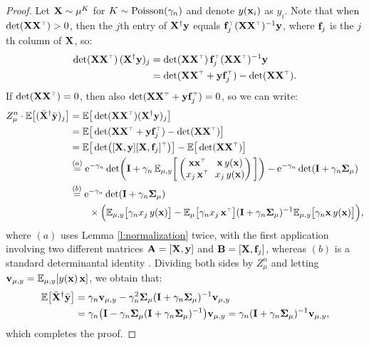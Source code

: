 \begin{proof}
   Let $\mathbf X\sim\mu^K$ for $K\sim{\operatorname{Poisson}}(\gamma_n)$ and denote
   $y(\mathbf x_i)$ as $y_i$.
  Note that when $\det(\X\X^\top)>0$, then
  the $j$th entry of $\mathbf X^\dagger\mathbf y$ equals
  $\f_j^\top(\X\X^\top)^{-1}\y$, where $\mathbf f_j$ is the $j$th
  column of $\mathbf X$, so:
\begin{align*}
  \det(\X\X^\top)\,(\X^\dagger\y)_j
  &= \det(\X\X^\top)\, \f_j^\top(\X\X^\top)^{-1}\y \\
  &=
  \det(\X\X^\top+\y\f_j^\top) - \det(\X\X^\top).
\end{align*}
If $\det(\X\X^\top)=0$, then also
$\det(\X\X^\top+\y\f_j^\top)=0$, so we can write:
\begin{align*}
Z_\mu^n\cdot\E\big[(\Xb^\dagger\ybb)_j\big]
  &=  \E\big[\det(\X\X^\top)(\X^\dagger\y)_j\big] \\
  &= \E\big[\det(\X\X^\top+\y\f_j^\top)-\det(\X\X^\top)\big]  \\
  &=\E\big[\det\!\big([\X,\y][\X,\f_j]^\top\big)\big] - \E\big[\det(\X\X^\top)\big]\\
  &\overset{(a)}{=}\ee^{-\gamma_n}\det\!\bigg(\I +
    \gamma_n\,\E_{\mu,y}\bigg[\begin{pmatrix}\x\x^\top&
      \!\!\x\, y(\x)\\ x_j\,\x^\top&\!\!
      x_j\,y(\x)\end{pmatrix}\bigg]\bigg)
                          -\ee^{-\gamma_n}\det(\I+\gamma_n\Sigmab_\mu)\\
  &\overset{(b)}{=}\ee^{-\gamma_n}\det(\I+\gamma_n\Sigmab_\mu) \\
    &\qquad \times \Big(\E_{\mu,y}\big[\gamma_n
    x_j\,y(\x)\big] - \E_{\mu}\big[\gamma_n
    x_j\,\x^\top\big](\I+\gamma_n\Sigmab_\mu)^{-1}\E_{\mu,y}\big[\gamma_n\x\,
    y(\x)\big]\Big),
\end{align*}
where $(a)$ uses Lemma \ref{l:normalization} twice, with the first
application involving two different matrices $\mathbf A=[\mathbf X,\mathbf y]$ and
$\mathbf B=[\mathbf X,\mathbf f_j]$, whereas $(b)$ is a standard determinantal identity
\cite[see Fact 2.14.2 in][]{matrix-mathematics}.
  Dividing both sides by $Z_\mu^n$ and letting $\mathbf v_{\mu,y}=\mathbb E_{\mu,y}[y(\mathbf x)\,\mathbf x]$, we obtain that:
  \begin{align*}
    \mathbb E\big[{\bar{\mathbf X}}^\dagger\bar{\mathbf y}\big]
    &= \gamma_n\mathbf v_{\mu,y} - \gamma_n^2\mathbf{\Sigma}_\mu(\mathbf I+\gamma_n\mathbf{\Sigma}_\mu)^{-1}\mathbf v_{\mu,y}\\
&=\gamma_n\big(\mathbf I - \gamma_n\mathbf{\Sigma}_\mu (\mathbf I+\gamma_n\mathbf{\Sigma}_\mu)^{-1}\big)\mathbf v_{\mu,y}
=\gamma_n(\mathbf I+\gamma_n\mathbf{\Sigma}_\mu)^{-1}\mathbf v_{\mu,y},
  \end{align*}
  which completes the proof.
\end{proof}
